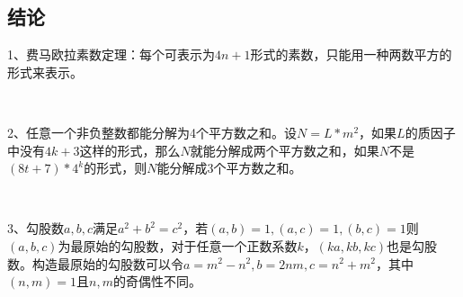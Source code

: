 \subsection{结论}
1、费马欧拉素数定理：每个可表示为$4n+1$形式的素数，只能用一种两数平方的形式来表示。 \par
~\\ \par
2、任意一个非负整数都能分解为4个平方数之和。设$N=L*m^2$，如果$L$的质因子中没有$4k+3$这样的形式，那么$N$就能分解成两个平方数之和，如果$N$不是$(8t+7)*4^k$的形式，则$N$能分解成3个平方数之和。 \par
~\\ \par

3、勾股数$a,b,c$满足$a^2+b^2=c^2$，若$(a,b)=1,(a,c)=1,(b,c)=1$则$(a,b,c)$为最原始的勾股数，对于任意一个正数系数$k$，$(ka,kb,kc)$也是勾股数。构造最原始的勾股数可以令$a=m^2-n^2,b=2nm,c=n^2+m^2$，其中$(n,m)=1$且$n,m$的奇偶性不同。\par
